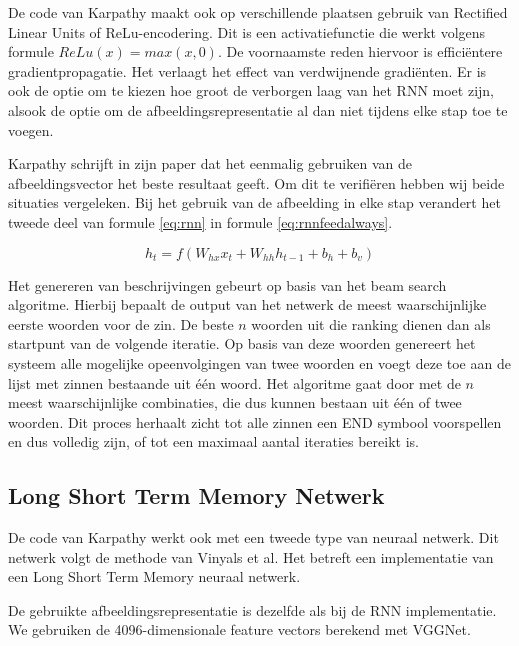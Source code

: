 De code van Karpathy maakt ook op verschillende plaatsen gebruik van Rectified Linear Units of ReLu-encodering. Dit is een activatiefunctie die werkt volgens formule $ReLu(x) = max(x,0)$. De voornaamste reden hiervoor is effici\"entere gradientpropagatie. Het verlaagt het effect van verdwijnende gradi\"enten\cite{Glorot2011}. Er is ook de optie om te kiezen hoe groot de verborgen laag van het RNN moet zijn, alsook de optie om de afbeeldingsrepresentatie al dan niet tijdens elke stap toe te voegen.

Karpathy schrijft in zijn paper dat het eenmalig gebruiken van de afbeeldingsvector het beste resultaat geeft. Om dit te verifi\"eren hebben wij beide situaties vergeleken. Bij het gebruik van de afbeelding in elke stap verandert het tweede deel van formule \eqref{eq:rnn} in formule \eqref{eq:rnnfeedalways}.

\begin{equation}
     h_t = f(W_{hx} x_{t} + W_{hh} h_{t-1} + b_h + b_v)
\label{eq:rnnfeedalways}
\end{equation}

Het genereren van beschrijvingen gebeurt op basis van het beam search algoritme. Hierbij bepaalt de output van het netwerk de meest waarschijnlijke eerste woorden voor de zin. De beste $n$ woorden uit die ranking dienen dan als startpunt van de volgende iteratie. Op basis van deze woorden genereert het systeem alle mogelijke opeenvolgingen van twee woorden en voegt deze toe aan de lijst met zinnen bestaande uit \'e\'en woord. Het algoritme gaat door met de $n$ meest waarschijnlijke combinaties, die dus kunnen bestaan uit \'e\'en of twee woorden. Dit proces herhaalt zicht tot alle zinnen een END symbool voorspellen en dus volledig zijn, of tot een maximaal aantal iteraties bereikt is. 
 

\subsection{Long Short Term Memory Netwerk}
\label{sec:lstm}
De code van Karpathy werkt ook met een tweede type van neuraal netwerk. Dit netwerk volgt de methode van Vinyals et al.\cite{Google} Het betreft een implementatie van een Long Short Term Memory neuraal netwerk. 

De gebruikte afbeeldingsrepresentatie is dezelfde als bij de RNN implementatie. We gebruiken de 4096-dimensionale feature vectors berekend met VGGNet. 

